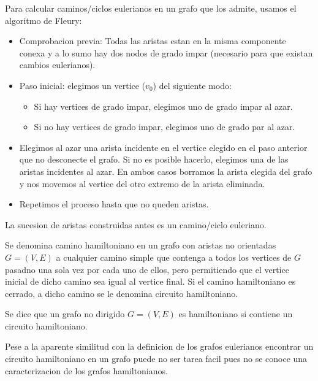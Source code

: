 \begin{proposition}
	Para calcular caminos/ciclos eulerianos en un grafo que los admite, usamos el algoritmo de Fleury:
	\begin{itemize}
		\item Comprobacion previa: Todas las aristas estan en la misma componente conexa y a lo sumo hay dos nodos de grado impar (necesario para que existan cambios eulerianos).
		\item Paso inicial: elegimos un vertice (\(v_0 \)) del siguiente modo:
		      \begin{itemize}
			      \item Si hay vertices de grado impar, elegimos uno de grado impar al azar.
			      \item Si no hay vertices de grado impar, elegimos uno de grado par al azar.
		      \end{itemize}
		\item Elegimos al azar una arista incidente en el vertice elegido en el paso anterior que no desconecte el grafo. Si no es posible hacerlo, elegimos una de las aristas incidentes al azar. En ambos casos borramos la arista elegida del grafo y nos movemos al vertice del otro extremo de la arista eliminada.
		\item Repetimos el proceso hasta que no queden aristas.
	\end{itemize}
	La sucesion de aristas construidas antes es un camino/ciclo euleriano.
\end{proposition}

\begin{definition}
	Se denomina camino hamiltoniano en un grafo con aristas no orientadas \(G = (V,E )\) a cualquier camino simple que contenga a todos los vertices de \(G \) pasadno una sola vez por cada uno de ellos, pero permitiendo que el vertice inicial de dicho camino sea igual al vertice final. Si el camino hamiltoniano es cerrado, a dicho camino se le denomina circuito hamiltoniano.
\end{definition}
\begin{definition}
	Se dice que un grafo no dirigido \(G = (V,E )\) es hamiltoniano si contiene un circuito hamiltoniano.
\end{definition}
Pese a la aparente similitud con la definicion de los grafos eulerianos encontrar un circuito hamiltoniano en un grafo puede no ser tarea facil pues no se conoce una caracterizacion de los grafos hamiltonianos.

